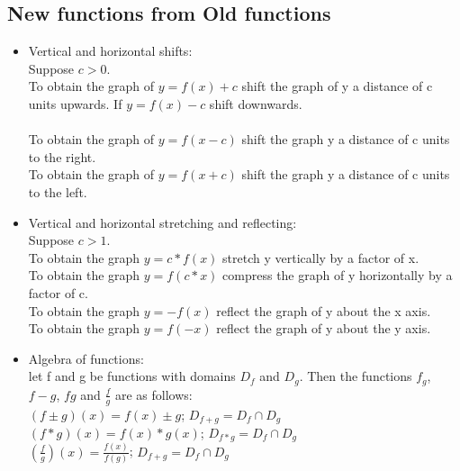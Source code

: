 \documentclass{article}
\begin{document}
\begin{enumerate}
	\subsection{New functions from Old functions}
	\begin{itemize}
		\item Vertical and horizontal shifts: \\
		Suppose $c>0$.\\ To obtain the graph of $y = f(x) + c$ shift the graph of y a distance of c units upwards. If $y = f(x)-c$ shift downwards. \\ \\
		To obtain the graph of $y=f(x-c)$ shift the graph y a distance of c units to the right. \\
		To obtain the graph of $y=f(x+c)$ shift the graph y a distance of c units to the left. \\
		\item Vertical and horizontal stretching and reflecting: \\
		Suppose $c>1$. \\
		To obtain the graph $y=c*f(x)$ stretch y vertically by a factor of x. \\
		To obtain the graph $y=f(c*x)$ compress the graph of y horizontally by a factor of c. \\
		To obtain the graph $y=-f(x)$ reflect the graph of y about the x axis. \\
		To obtain the graph $y=f(-x)$ reflect the graph of y about the y axis. \\
		\item Algebra of functions: \\
		let f and g be functions with domains $D_f$ and $D_g$. Then the functions $f_g$, $f-g$, $fg$ and $\frac{f}{g}$ are as follows: \\
		$(f\pm g)(x) = f(x)\pm g$; $D_{f+g} = D_f \cap D_g$ \\ 
		$(f* g)(x) = f(x)*g(x)$; $D_{f*g} = D_f \cap D_g$\\
		$(\frac{f}{g})(x) = \frac{f(x)}{f(g)}$; $D_{f+g} = D_f \cap D_g$
	\end{itemize}
	
\end{enumerate}
\end{document}
